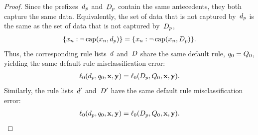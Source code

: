 \begin{proof}
Since the prefixes~$d_p$ and~$D_p$ contain
the same antecedents, they both capture the same data.
%
Equivalently, the set of data that is not captured by~$d_p$
is the same as the set of data that is not captured by~$D_p$, \ie
\begin{align}
\{x_n : \neg\, \Cap(x_n, \Prefix)\} = \{x_n : \neg\, \Cap(x_n, \PrefixB)\}.
\end{align}
Thus, the corresponding rule lists~${d}$ and~${D}$
share the same default rule, \ie ${q_0 = Q_0}$,
yielding the same default rule misclassification error:
\begin{align}
\Loss_0(\Prefix, \Default, \x, \y) = \Loss_0(\PrefixB, \DefaultB, \x, \y).
\end{align}
Similarly, the rule lists~${d}'$ and~${D}'$ have the same
default rule misclassification error:
\begin{align}
\Loss_0(\Prefix, \Default, \x, \y) = \Loss_0(\PrefixB, \DefaultB, \x, \y).
\end{align}


\end{proof}

